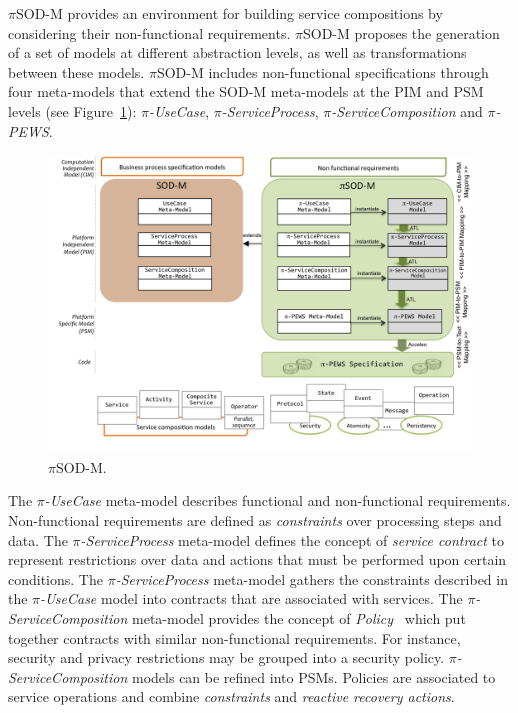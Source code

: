 \documentclass{llncs}
\theoremstyle{plain}
\theoremstyle{plain}
\theoremstyle{plain}
\begin{document}
$\pi$SOD-M provides an environment for building service compositions by considering their non-functional requirements. $\pi$SOD-M proposes the generation of a set of models at different abstraction levels, as well as transformations between these models.
$\pi$SOD-M includes non-functional specifications through
 four meta-models that extend the SOD-M meta-models at the PIM and PSM levels (see Figure~\ref{fig:piSOD-M}): \textit{$\pi$-UseCase}, \textit{$\pi$-ServiceProcess}, \textit{$\pi$-ServiceCom\-po\-si\-tion} and \textit{$\pi$-PEWS}.

\begin{figure}[t]
\centering
\includegraphics[width=1\textwidth]{piSOD-M.png}
\caption{$\pi$SOD-M.}
\label{fig:piSOD-M}
\end{figure}
%
The \textit{$\pi$-UseCase} meta-model describes functional and non-functional requirements.
Non-functional requirements are defined as \textit{constraints} over processing steps and data. 
%
The \textit{$\pi$-ServiceProcess} meta-model defines the concept of \textit{service contract} to represent restrictions over data and actions that must be performed upon certain conditions. 
%
The \textit{$\pi$-ServiceProcess} meta-model gathers the constraints
described in the \textit{$\pi$-UseCase} model into contracts that are associated with services. 
%
The \textit{$\pi$-ServiceComposition} meta-model provides the concept of \textit{Policy}~\cite{Espinosa-Oviedo2011a}
which put together contracts with similar non-functional requirements. 
For instance, security and privacy restrictions may be grouped into a security policy.
\textit{$\pi$-ServiceComposition} models can be refined into PSMs. Policies are associated to service operations and combine \textit{constraints} and \textit{reactive recovery actions}.
\end{document}
